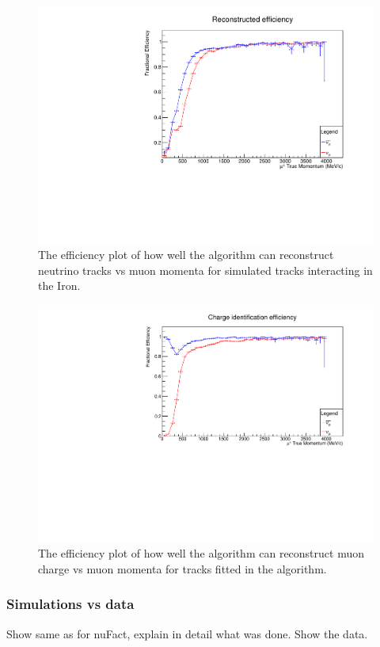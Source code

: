 \begin{figure}[h!]
\centering
\includegraphics[width=.9\textwidth]{figures/NeutrinoChap/Neutrino/T2KIronRecEff.pdf}
\caption{The efficiency plot of how well the algorithm can reconstruct neutrino tracks vs muon momenta for simulated tracks interacting in the Iron.}
\label{fig:IronMINDfitted}
\end{figure}

\begin{figure}[h!]
\centering
\includegraphics[width=.9\textwidth]{figures/NeutrinoChap/Neutrino/T2KIronChargeEff.pdf}
\caption{The efficiency plot of how well the algorithm can reconstruct muon charge vs muon momenta for tracks fitted in the algorithm.}
\label{fig:IronMINDfittedcharge}
\end{figure}

\pagebreak
\subsubsection{Simulations vs data}
Show same as for nuFact, explain in detail what was done. Show the data.

